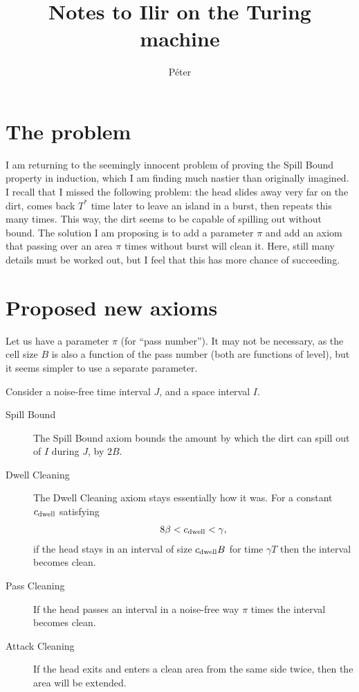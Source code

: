 \documentclass[12pt]{memoir}
\def\B{B}
\newcommand{\Tu}{T}
\newcommand{\Cns}[2]{#1_{\textrm{\upshape #2}}}
\newcommand{\cns}[1]{\Cns{c}{#1}}
\newcommand{\cDwell}{\cns{dwell}}
\begin{document}
\title{Notes to Ilir on the Turing machine}

\author{P\'eter}

\maketitle

\section{The problem}

I am returning to the seemingly innocent problem of proving the Spill Bound property
in induction, which I am finding much nastier than originally imagined.
I recall that I missed the following problem: 
the head slides away very far on the dirt, 
comes back \( \Tu^{*} \) time later to leave an island in a burst, 
then repeats this many times.
This way, the dirt seems to be capable of spilling out without bound.
The solution I am proposing is to add a parameter \( \pi \)
and add an axiom that passing over an area \( \pi \) times without burst will clean it.
Here, still many details must be worked out, but I feel that this has more chance of succeeding.

\section{Proposed new axioms}

Let us have a parameter \( \pi \) (for ``pass number'').
It may not be necessary, as the cell size \( \B \) is also a function of the pass number
(both are functions of level), but it seems simpler to use a separate parameter.

Consider a noise-free time interval \( J \), and a space interval \( I \).

\begin{description}
\item[Spill Bound] 
The Spill Bound axiom bounds the amount by which the dirt can spill out
of \( I \) during \( J \), by \( 2\B \).

\item[Dwell Cleaning]
The Dwell Cleaning axiom stays essentially how it was.
For a constant \( \cDwell \) satisfying
\begin{align}\label{eq:cDwell}
 8\beta<\cDwell < \gamma,
 \end{align}
 if the head stays in an interval of size \( \cDwell\B \) for time \( \gamma\Tu \)
then the interval becomes clean.

\item[Pass Cleaning]
If the head passes an interval in a noise-free way \( \pi \) times
the interval becomes clean.

\item[Attack Cleaning]
If the head exits and enters a clean area from the same side
twice, then the area will be extended.

\end{description}
\end{document}

